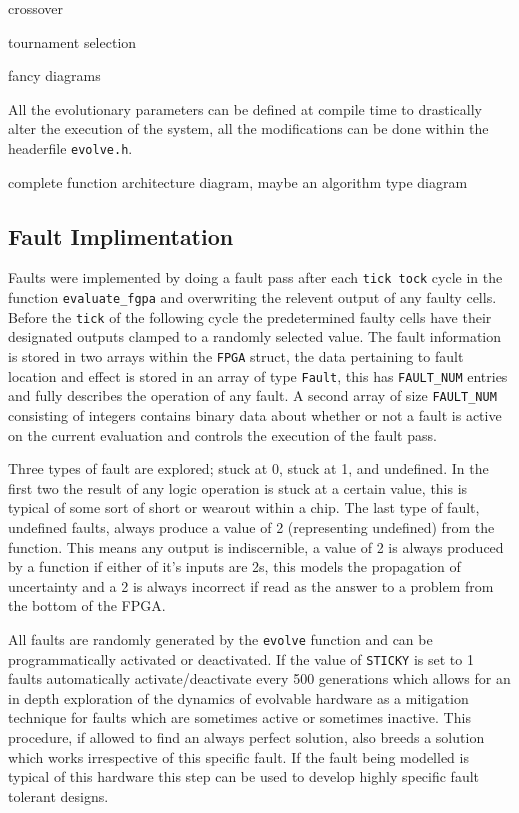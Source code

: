 \todo crossover

\todo tournament selection

\todo fancy diagrams

All the evolutionary parameters can be defined at compile time to drastically
alter the execution of the system, all the modifications can be done within
the headerfile \texttt{evolve.h}.

\todo complete function architecture diagram, maybe an algorithm type diagram

\subsection{Fault Implimentation}
Faults were implemented by doing a fault pass after each \texttt{tick tock} cycle in
the function \texttt{evaluate\_fgpa} and
overwriting the relevent output of any faulty cells. Before the \texttt{tick} of the
following cycle the predetermined faulty cells have their designated outputs
clamped to a randomly selected value. The fault information is stored in
two arrays within the \texttt{FPGA} struct, the data pertaining to fault
location and effect is stored in an array of type \texttt{Fault}, this has
\texttt{FAULT\_NUM} entries and fully describes the operation of any fault.
A second array of size \texttt{FAULT\_NUM} consisting of integers contains
binary data about whether or not a fault is active on the current evaluation
and controls the execution of the fault pass.

Three types of fault are explored; stuck at 0, stuck at 1, and undefined. In
the first two the result of any logic operation is stuck at a certain value, this
is typical of some sort of short or wearout within a chip. The last type of fault,
undefined faults, always produce a value of 2 (representing undefined) from the function. This means any
output is indiscernible, a value of 2 is always produced by a function if either
of it's inputs are 2s, this models the propagation of uncertainty and a 2 is always
incorrect if read as the answer to a problem from the bottom of the FPGA.

All faults are randomly generated by the \texttt{evolve} function and can be
programmatically activated or deactivated. If the value of \texttt{STICKY} is
set to 1 faults automatically activate/deactivate every 500 generations which
allows for an in depth exploration of the dynamics of evolvable hardware as a
mitigation technique for faults which are sometimes active or sometimes inactive.
This procedure, if allowed to find an always perfect solution, also breeds a solution
which works irrespective of this specific fault. If the fault being modelled is
typical of this hardware this step can be used to develop highly specific
fault tolerant designs.

